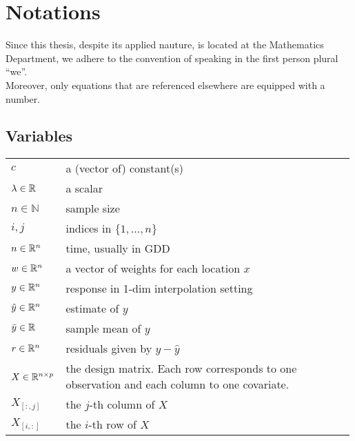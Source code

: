 \chapter*{\vspace{-3.2cm} Notations}
\label{c:Notation}
\vspace{-0.6cm}
Since this thesis, despite its applied nauture, is located at the Mathematics Department, we adhere to the convention of speaking in the first person plural ``we''.\\
Moreover, only equations that are referenced elsewhere are equipped with a number.

\section*{Variables}\vspace{-0.2cm}
\renewcommand{\arraystretch}{1.3} %
\begin{longtable}{p{0.12\linewidth} p{0.87\linewidth}}
$c$		& a (vector of) constant(s)\\
$\lambda \in \mathbb{R}$		& a scalar\\
$n\in \mathbb{N}$		& sample size\\
$i,j$		& indices in $\{1,\dots,n\}$\\
$n\in \mathbb{R}^n$		& time, usually in GDD\\
$w \in \mathbb{R}^n$		& a vector of weights for each location $x$\\
$y\in \mathbb{R}^n$		& response in 1-dim interpolation setting\\
$\hat y\in \mathbb{R}^n$		& estimate of $y$\\
$\bar y\in \mathbb{R}$		& sample mean of $y$\\
$r \in \mathbb{R}^n$		& residuals given by $y - \hat y$\\
$X\in\mathbb{R}^{n\times p}$ & the design matrix. Each row corresponds to one observation and each column to one covariate.\\
$X_{[:,j]}$ 	& the $j$-th column of $X$\\
$X_{[i,:]}$ 	& the $i$-th row of $X$
\end{longtable}


